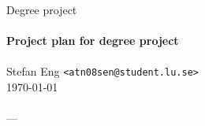 \documentclass[10pt]{article}
\begin{document}
\begin{center}

%
%
%
%

  Degree project \\
  \ \\
  {\large
    \textbf{Project plan for degree project}
  } \\
  \ \\
  Stefan Eng \texttt{<atn08sen@student.lu.se>}
  \ \\
  \today \\
  \ \\
  ---
  \vspace{-0.3cm}

\end{center}
\end{document}
